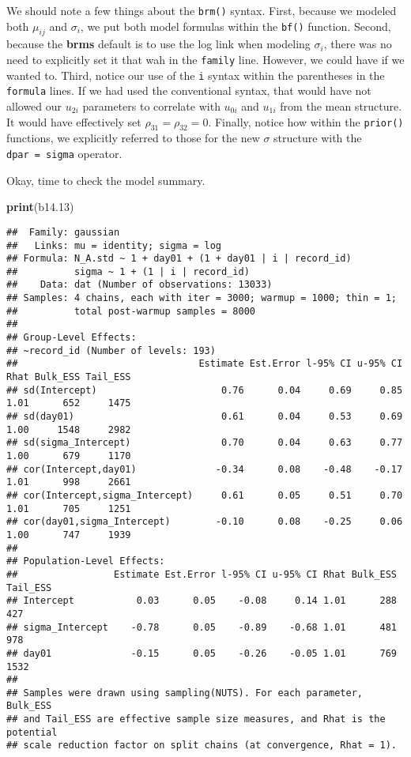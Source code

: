 \documentclass[]{article}
\newenvironment{Shaded}{\begin{snugshade}}{\end{snugshade}}
\newcommand{\FloatTok}[1]{\textcolor[rgb]{0.00,0.00,0.81}{#1}}
\newcommand{\KeywordTok}[1]{\textcolor[rgb]{0.13,0.29,0.53}{\textbf{#1}}}
\newcommand{\NormalTok}[1]{#1}
\begin{document}
We should note a few things about the \texttt{brm()} syntax. First,
because we modeled both \(\mu_{ij}\) and \(\sigma_i\), we put both model
formulas within the \texttt{bf()} function. Second, because the
\textbf{brms} default is to use the log link when modeling \(\sigma_i\),
there was no need to explicitly set it that wah in the \texttt{family}
line. However, we could have if we wanted to. Third, notice our use of
the \texttt{\textbar{}i\textbar{}} syntax within the parentheses in the
\texttt{formula} lines. If we had used the conventional
\texttt{\textbar{}} syntax, that would have not allowed our \(u_{2i}\)
parameters to correlate with \(u_{0i}\) and \(u_{1i}\) from the mean
structure. It would have effectively set \(\rho_{31} = \rho_{32} = 0\).
Finally, notice how within the \texttt{prior()} functions, we explicitly
referred to those for the new \(\sigma\) structure with the
\texttt{dpar\ =\ sigma} operator.

Okay, time to check the model summary.

\begin{Shaded}
\begin{Highlighting}[]
\KeywordTok{print}\NormalTok{(b14}\FloatTok{.13}\NormalTok{)}
\end{Highlighting}
\end{Shaded}

\begin{verbatim}
##  Family: gaussian 
##   Links: mu = identity; sigma = log 
## Formula: N_A.std ~ 1 + day01 + (1 + day01 | i | record_id) 
##          sigma ~ 1 + (1 | i | record_id)
##    Data: dat (Number of observations: 13033) 
## Samples: 4 chains, each with iter = 3000; warmup = 1000; thin = 1;
##          total post-warmup samples = 8000
## 
## Group-Level Effects: 
## ~record_id (Number of levels: 193) 
##                                Estimate Est.Error l-95% CI u-95% CI Rhat Bulk_ESS Tail_ESS
## sd(Intercept)                      0.76      0.04     0.69     0.85 1.01      652     1475
## sd(day01)                          0.61      0.04     0.53     0.69 1.00     1548     2982
## sd(sigma_Intercept)                0.70      0.04     0.63     0.77 1.00      679     1170
## cor(Intercept,day01)              -0.34      0.08    -0.48    -0.17 1.01      998     2661
## cor(Intercept,sigma_Intercept)     0.61      0.05     0.51     0.70 1.01      705     1251
## cor(day01,sigma_Intercept)        -0.10      0.08    -0.25     0.06 1.00      747     1939
## 
## Population-Level Effects: 
##                 Estimate Est.Error l-95% CI u-95% CI Rhat Bulk_ESS Tail_ESS
## Intercept           0.03      0.05    -0.08     0.14 1.01      288      427
## sigma_Intercept    -0.78      0.05    -0.89    -0.68 1.01      481      978
## day01              -0.15      0.05    -0.26    -0.05 1.01      769     1532
## 
## Samples were drawn using sampling(NUTS). For each parameter, Bulk_ESS
## and Tail_ESS are effective sample size measures, and Rhat is the potential
## scale reduction factor on split chains (at convergence, Rhat = 1).
\end{verbatim}
\end{document}
